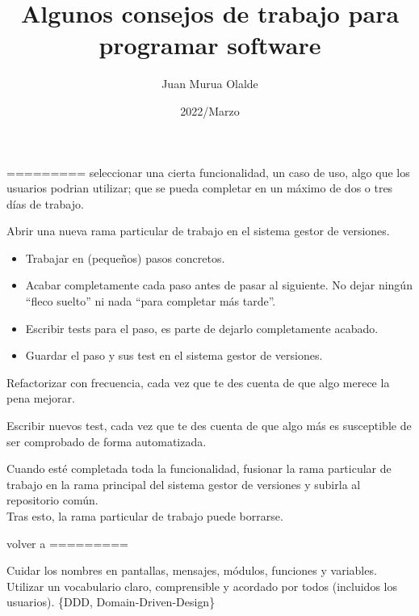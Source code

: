 \documentclass[spanish,10pt,a4paper,final,oneside]{article}
\title{Algunos consejos de trabajo para programar software}
\author{Juan Murua Olalde}
\date{2022/Marzo}
\begin{document}
\begin{center}\begin{LARGE}
\MyTitle
\end{LARGE}\end{center}
\begin{footnotesize}
\end{footnotesize}

\hypersetup{linkcolor=black}

\vspace{2cm}

========= seleccionar una cierta funcionalidad, un caso de uso, algo que los usuarios podrian utilizar; que se pueda completar en un máximo de dos o tres días de trabajo.

Abrir una nueva rama particular de trabajo en el sistema gestor de versiones.

\begin{itemize}
\item Trabajar en (pequeños) pasos concretos.
\item Acabar completamente cada paso antes de pasar al siguiente. No dejar ningún ``fleco suelto'' ni nada ``para completar más tarde''.
\item Escribir tests para el paso, es parte de dejarlo completamente acabado.
\item Guardar el paso y sus test en el sistema gestor de versiones.
\end{itemize}

Refactorizar con frecuencia, cada vez que te des cuenta de que algo merece la pena mejorar.

Escribir nuevos test, cada vez que te des cuenta de que algo más es susceptible de ser comprobado de forma automatizada.

Cuando esté completada toda la funcionalidad, fusionar la rama particular de trabajo en la rama principal del sistema gestor de versiones y subirla al repositorio común.
\\Tras esto, la rama particular de trabajo puede borrarse.

volver a =========

\vspace{2cm}

Cuidar los nombres en pantallas, mensajes, módulos, funciones y variables. Utilizar un vocabulario claro, comprensible y acordado por todos (incluidos los usuarios).  \{DDD, Domain-Driven-Design\}
\end{document}
